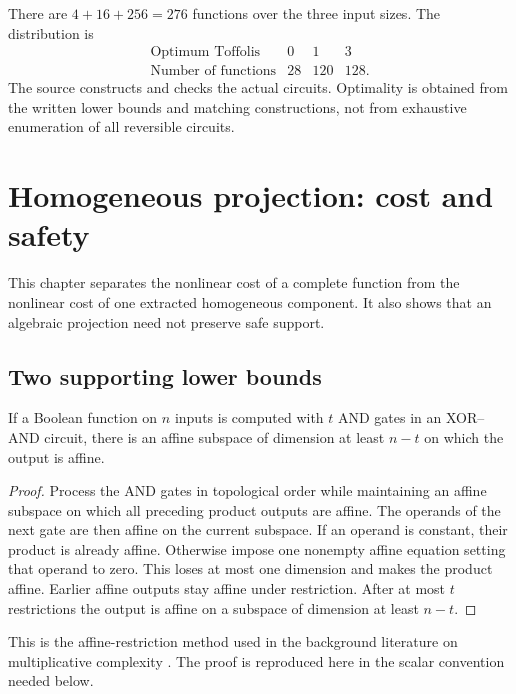 There are $4+16+256=276$ functions over the three input sizes. The distribution is
\[
 \begin{array}{c|rrr}
 \text{Optimum Toffolis}&0&1&3\\\hline
 \text{Number of functions}&28&120&128.
 \end{array}
\]
The source constructs and checks the actual circuits. Optimality is obtained from the written lower bounds and matching constructions, not from exhaustive enumeration of all reversible circuits.

\chapter{Homogeneous projection: cost and safety}
\label{c:ch:projection}
This chapter separates the nonlinear cost of a complete function from the nonlinear cost of one extracted homogeneous component. It also shows that an algebraic projection need not preserve safe support.

\section{Two supporting lower bounds}
\begin{lemma}\label{c:lem:affine-subspace}
If a Boolean function on $n$ inputs is computed with $t$ AND gates in an XOR--AND circuit, there is an affine subspace of dimension at least $n-t$ on which the output is affine.
\end{lemma}
\begin{proof}
Process the AND gates in topological order while maintaining an affine subspace on which all preceding product outputs are affine. The operands of the next gate are then affine on the current subspace. If an operand is constant, their product is already affine. Otherwise impose one nonempty affine equation setting that operand to zero. This loses at most one dimension and makes the product affine. Earlier affine outputs stay affine under restriction. After at most $t$ restrictions the output is affine on a subspace of dimension at least $n-t$.
\end{proof}
This is the affine-restriction method used in the background literature on multiplicative complexity \cite{c:findboyar}. The proof is reproduced here in the scalar convention needed below.

